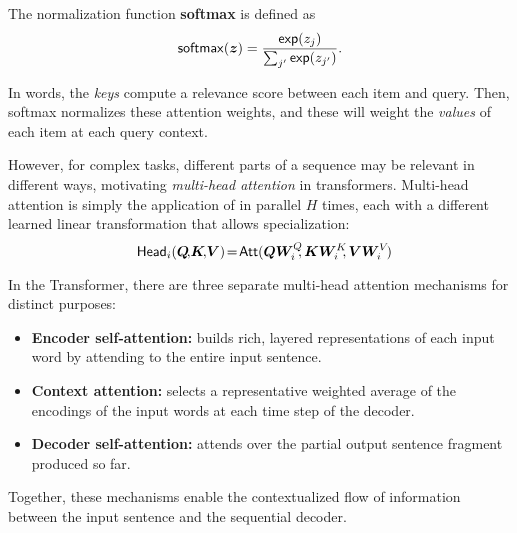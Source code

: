 \begin{definition}
    The normalization function \textbf{softmax} is defined as
    \begin{equation}\label{eq:softmax}
        \operatorname*{\mathsf{softmax}}(\bm{z}) = \frac{\operatorname*{\mathsf{exp}}(z_j)}{\sum_{j'} \operatorname*{\mathsf{exp}}(z_{j'})}.
    \end{equation}
\end{definition}

In words, the \emph{keys} compute a relevance score between each item
and query. Then, softmax normalizes these attention weights, and
these will weight the \emph{values} of each item at each query
context.

However, for complex tasks, different parts of a sequence may be
relevant in different ways, motivating \emph{multi-head attention} in
transformers. Multi-head attention is simply the application of
 in parallel $H$ times, each with a
different learned linear transformation that allows specialization:
%
\begin{equation}\label{eq:head}%
    \hspace{-.01ex}%
    \ath_i(\bm{Q}\!,\!\bm{K}\!,\!\bm{V})\!=\!\att(\bm{QW}_i^Q\!\!,\bm{KW}_i^K\!\!,\bm{VW}_i^V\!)%
    \hspace{-1.5ex}%
\end{equation}

In the Transformer, there are three separate multi-head attention mechanisms for
distinct purposes:
\begin{itemize}
    \item \textbf{Encoder self-attention:} builds rich, layered representations of
          each input word by attending to the entire input sentence.
    \item \textbf{Context attention:} selects
          a representative weighted average of the encodings of the input words at each
          time step of the decoder.
    \item \textbf{Decoder self-attention:} attends over the partial output sentence
          fragment produced so far.
\end{itemize}
Together, these mechanisms enable the contextualized flow of information between
the input sentence and the sequential decoder.


